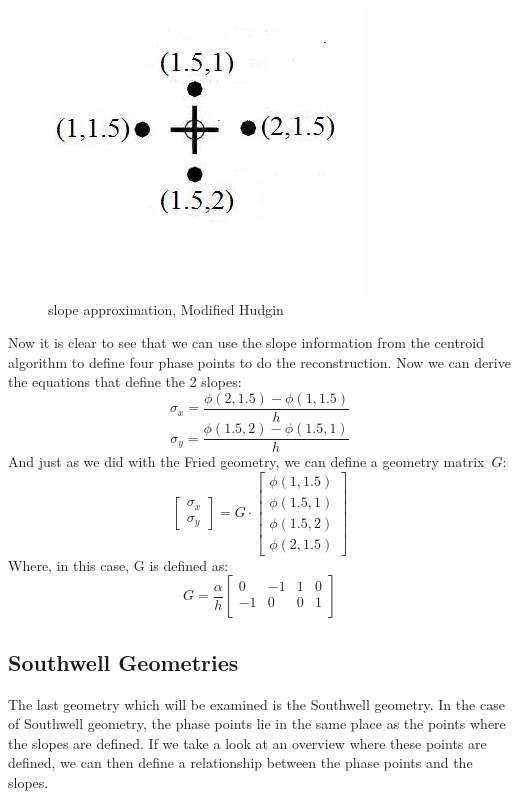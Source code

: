 \documentclass{article}
\begin{document}
\begin{figure}[h!]
  \centering
  \includegraphics[scale=0.6]{figures/mod_hudgin}
  \caption{slope approximation, Modified Hudgin}
\end{figure}
\noindent Now it is clear to see that we can use the slope information from the centroid algorithm to define four phase points to do the reconstruction. Now we can derive the equations that define the 2 slopes:
$$ \sigma_x = \frac{\phi(2,1.5)-\phi(1,1.5)}{h}$$
$$ \sigma_y = \frac{\phi(1.5,2)-\phi(1.5,1)}{h}$$
And just as we did with the Fried geometry, we can define a geometry matrix~$G$:
$$ 
\begin{bmatrix}
\sigma_x \\
\sigma_y
\end{bmatrix} 
=
G
\cdot
\begin{bmatrix}
\phi(1,1.5) \\
\phi(1.5,1) \\
\phi(1.5,2) \\
\phi(2,1.5) 
\end{bmatrix}
$$
Where, in this case, G is defined as:
$$
G
=
\frac{\alpha}{h}
\begin{bmatrix}
0 & -1 & 1 & 0 \\
-1 & 0 & 0 & 1 \\
\end{bmatrix}
$$


\subsection{Southwell Geometries}
The last geometry which will be examined is the Southwell geometry. In the case of Southwell geometry, the phase points lie in the same place as the points where the slopes are defined. If we take a look at an overview where these points are defined, we can then define a relationship between the phase points and the slopes.
\end{document}
